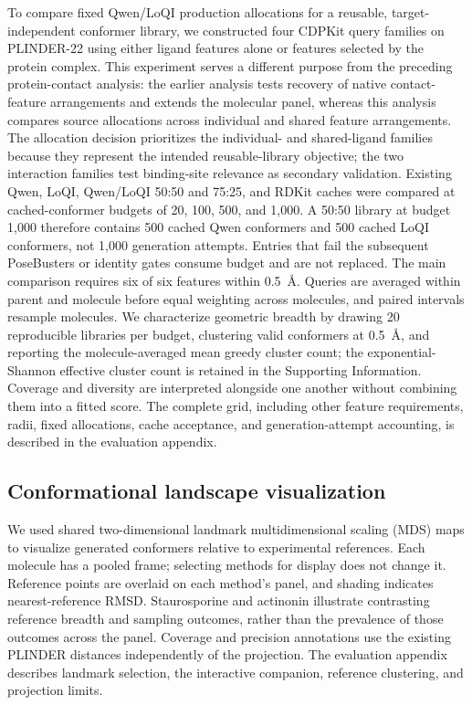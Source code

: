 To compare fixed Qwen/LoQI production allocations for a reusable, target-independent
conformer library, we constructed four CDPKit query families on PLINDER-22 using
either ligand features alone or features selected by the protein complex. This
experiment serves a different purpose from the preceding protein-contact analysis:
the earlier analysis tests recovery of native contact-feature arrangements and extends
the molecular panel, whereas this analysis compares source allocations across
individual and shared feature arrangements. The allocation decision prioritizes the
individual- and shared-ligand families because they represent the intended reusable-library
objective; the two interaction families test binding-site relevance as secondary validation.
Existing Qwen, LoQI, Qwen/LoQI 50:50 and 75:25, and RDKit caches were compared at
cached-conformer budgets of 20, 100, 500, and 1,000. A 50:50 library at budget
1,000 therefore contains 500 cached Qwen conformers and 500 cached LoQI conformers,
not 1,000 generation attempts. Entries that fail the subsequent PoseBusters or
identity gates consume budget and are not replaced. The main comparison requires
six of six features within 0.5~\AA{}. Queries are averaged within parent and molecule
before equal weighting across molecules, and paired intervals resample molecules.
We characterize geometric breadth by drawing 20 reproducible libraries per budget,
clustering valid conformers at 0.5~\AA{}, and reporting the molecule-averaged mean
greedy cluster count;
the exponential-Shannon effective cluster count is retained in the Supporting
Information. Coverage and diversity are interpreted alongside one another without
combining them into a fitted score. The complete grid, including other feature
requirements, radii, fixed allocations, cache acceptance, and generation-attempt
accounting, is described in the evaluation appendix.

\subsection{Conformational landscape visualization}

We used shared two-dimensional landmark multidimensional scaling (MDS) maps to visualize
generated conformers relative to experimental references. Each molecule has a pooled frame;
selecting methods for display does not change it. Reference points are overlaid on each
method's panel, and shading indicates nearest-reference RMSD. Staurosporine and actinonin
illustrate contrasting reference breadth and sampling outcomes, rather than the prevalence
of those outcomes across the panel. Coverage and precision annotations use the existing
PLINDER distances independently of the projection. The evaluation appendix describes
landmark selection, the interactive companion, reference clustering, and projection limits.

